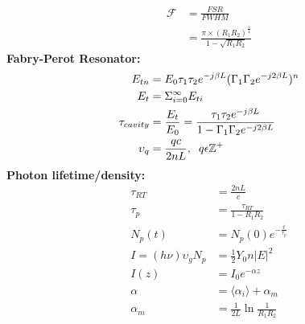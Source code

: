 \documentclass[landscape,a4paper,8pt]{article}
\begin{document}
\begin{multicols}{4}
\begin{align}
		\mathscr{F} &= \frac{FSR}{FWHM}\\
		&= \frac{\pi\times (R_1 R_2)^\frac{1}{4}}{1 - \sqrt{R_1 R_2}}
	\end{align}
	\hspace{3mm}\textbf{Fabry-Perot Resonator:}
	\begin{align}
		E_{tn} &= E_0 \tau_1 \tau_2 e^{-j\beta L} (\Gamma_1 \Gamma_2 e^{-j 2 \beta L})^n\\
		E_t &= \Sigma_{i=0}^\infty E_{ti}\\
		\tau_{cavity} &= \frac{E_t}{E_0} = \frac{\tau_1 \tau_2 e^{-j \beta L}}{1 - \Gamma_1 \Gamma_2 e^{-j2 \beta L}}\\
		\upsilon_q &= \frac{qc}{2nL},\hspace{2mm} q \epsilon \mathbb{Z^+}
	\end{align}
	\hspace{3mm}\textbf{Photon lifetime/density:}
	\begin{align}
		\tau_{RT} &= \frac{2nL}{c}\\
		\tau_p &= \frac{\tau_{RT}}{1 - R_1 R_2}\\
		N_p (t) &= N_p (0) e^{-\frac{t}{\tau_p}}\\
		I = (h\nu)\upsilon_g N_p &= \frac{1}{2} Y_0 n |E|^2\\
		I(z) &= I_0 e^{-\alpha z}\\
		\alpha &=  \langle\alpha_i\rangle + \alpha_m\\
		\alpha_m &= \frac{1}{2L} \ln \frac{1}{R_1 R_2}
	\end{align}
	

\end{multicols}
\end{document}
